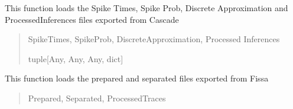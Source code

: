 \documentclass[letterpaper,10pt,english]{sphinxmanual}
\begin{document}
\begin{fulllineitems}
\begin{fulllineitems}
\begin{quote}
\begin{description}
\end{description}\end{quote}

\end{fulllineitems}


\begin{fulllineitems}
\label{\detokenize{ExperimentHierarchy:ExperimentHierarchy.CollectedImagingAnalysisFolder.load_cascade_exports}}
\pysigstartsignatures
{}
\pysigstopsignatures
\sphinxAtStartPar
This function loads the Spike Times, Spike Prob, Discrete Approximation and ProcessedInferences files exported from Cascade
\begin{quote}\begin{description}
\sphinxAtStartPar
SpikeTimes, SpikeProb, DiscreteApproximation, Processed Inferences

\sphinxAtStartPar
tuple{[}Any, Any, Any, dict{]}

\end{description}\end{quote}

\end{fulllineitems}


\begin{fulllineitems}
\label{\detokenize{ExperimentHierarchy:ExperimentHierarchy.CollectedImagingAnalysisFolder.load_fissa_exports}}
\pysigstartsignatures
{}
\pysigstopsignatures
\sphinxAtStartPar
This function loads the prepared and separated files exported from Fissa
\begin{quote}\begin{description}
\sphinxAtStartPar
Prepared, Separated, ProcessedTraces


\end{description}
\end{quote}
\end{fulllineitems}
\end{fulllineitems}
\end{document}
